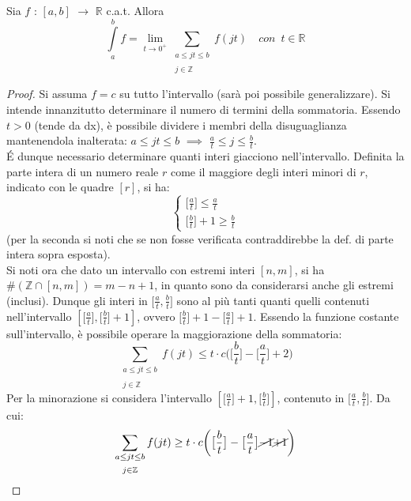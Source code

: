 \documentclass[10pt]{article}
\theoremstyle{plain}
\begin{document}
\begin{lem}
    Sia $f$ : $[a,b]$ $\rightarrow$ $\mathbb{R}$ c.a.t. Allora
    \[\int\limits_{a}^{b} f = \lim\limits_{t \rightarrow 0^+}^{} \sum_{\substack{a \leq jt \leq b \\~\\ j \in \mathbb{Z}}} f(jt) \quad con \enspace t \in \mathbb{R}\]
\end{lem}
\begin{proof}
    Si assuma $f = c$ su tutto l'intervallo (sarà poi possibile generalizzare).
    Si intende innanzitutto determinare il numero di termini della sommatoria. Essendo $t > 0$ (tende da dx), è possibile dividere i membri della disuguaglianza mantenendola inalterata: $a \leq jt \leq b$ $\implies$ $\frac{a}{t} \leq j \leq \frac{b}{t}$.
    \\\'E dunque necessario determinare quanti interi giacciono nell'intervallo. Definita la parte intera di un numero reale $r$ come il maggiore degli interi minori di $r$, indicato con le quadre $[r]$, si ha:
    \[\begin{cases}
        \big[\frac{a}{t}\big] \leq \frac{a}{t}\\
        \big[\frac{b}{t}\big] + 1 \geq \frac{b}{t}
    \end{cases}\]
    (per la seconda si noti che se non fosse verificata contraddirebbe la def. di parte intera sopra esposta).
    \\Si noti ora che dato un intervallo con estremi interi $[n, m]$, si ha $\#(\mathbb{Z} \cap [n,m]) = m - n + 1$, in quanto sono da considerarsi anche gli estremi (inclusi). Dunque gli interi in $\big[\frac{a}{t}, \frac{b}{t}\big]$ sono al più tanti quanti quelli contenuti nell'intervallo $[\big[\frac{a}{t}\big], \big[\frac{b}{t}\big] + 1]$, ovvero $\big[\frac{b}{t}\big] + 1 - \big[\frac{a}{t}\big] + 1$. Essendo la funzione costante sull'intervallo, è possibile operare la maggiorazione della sommatoria:
    \[\sum_{\substack{a \leq jt \leq b \\~\\ j \in \mathbb{Z}}} f(jt) \leq t \cdot c \bigg(\big[\frac{b}{t}\big] - \big[\frac{a}{t}\big] + 2\bigg)\]
    Per la minorazione si considera l'intervallo $[\big[\frac{a}{t}\big] + 1, \big[\frac{b}{t}\big]]$, contenuto in $\big[\frac{a}{t}, \frac{b}{t}\big]$. Da cui:
    \[\sum_{\substack{a \leq jt \leq b \\~\\ j \in \mathbb{Z}}} f(jt) \geq t \cdot c \bigg(\big[\frac{b}{t}\big] - \big[\frac{a}{t}\big] \cancel{-1} \cancel{+1}\bigg)\]

\end{proof}
\end{document}
